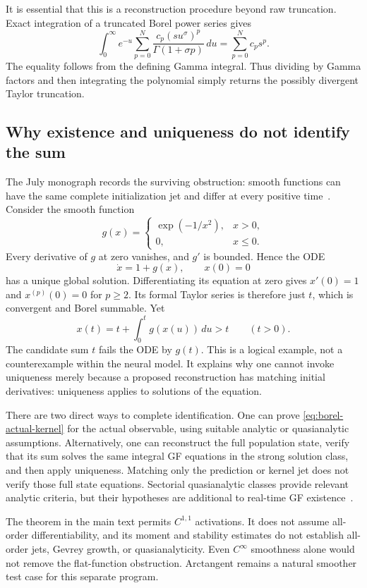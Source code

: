 It is essential that this is a reconstruction procedure beyond raw
truncation.  Exact integration of a truncated Borel power series gives
\[
 \int_0^\infty e^{-u}
   \sum_{p=0}^N\frac{c_p(su^\sigma)^p}{\Gamma(1+\sigma p)}\,du
 =\sum_{p=0}^N c_p s^p.
\]
The equality follows from the defining Gamma integral.  Thus dividing by
Gamma factors and then integrating the polynomial simply returns the
possibly divergent Taylor truncation.

\subsection{Why existence and uniqueness do not identify the sum}

The July monograph records the surviving obstruction: smooth functions can
have the same complete initialization jet and differ at every positive
time~\cite[Section~5.7.6]{ProjectMonograph}.  Consider the smooth function
\[
 g(x)=
 \begin{cases}
  \exp(-1/x^2),&x>0,\\
  0,&x\le0.
 \end{cases}
\]
Every derivative of $g$ at zero vanishes, and $g'$ is bounded.  Hence the ODE
\[
 \dot x=1+g(x),\qquad x(0)=0
\]
has a unique global solution.  Differentiating its equation at zero gives
$x'(0)=1$ and $x^{(p)}(0)=0$ for $p\ge2$.  Its formal Taylor series is
therefore just $t$, which is convergent and Borel summable.  Yet
\[
 x(t)=t+\int_0^t g(x(u))\,du>t\qquad(t>0).
\]
The candidate sum $t$ fails the ODE by $g(t)$.  This is a logical example,
not a counterexample within the neural model.  It explains why one cannot
invoke uniqueness merely because a proposed reconstruction has matching
initial derivatives: uniqueness applies to solutions of the equation.

There are two direct ways to complete identification.  One can prove
\eqref{eq:borel-actual-kernel} for the actual observable, using suitable
analytic or quasianalytic assumptions.  Alternatively, one can reconstruct
the full population state, verify that its sum solves the same integral
GF equations in the strong solution class, and then apply uniqueness.
Matching only the prediction or kernel jet does not verify those full
state equations.  Sectorial quasianalytic classes provide relevant analytic
criteria, but their hypotheses are additional to real-time GF
existence~\cite{LastraMalekSanz}.

The theorem in the main text permits $C^{1,1}$ activations.  It does not
assume all-order differentiability, and its moment and stability estimates
do not establish all-order jets, Gevrey growth, or quasianalyticity.  Even
$C^\infty$ smoothness alone would not remove the flat-function obstruction.
Arctangent remains a natural smoother test case for this separate program.

